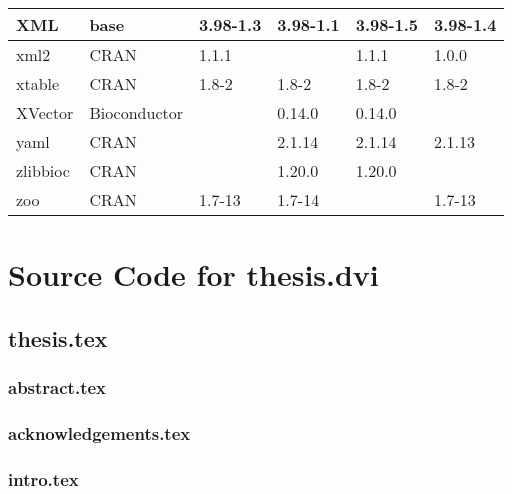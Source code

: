\begin{longtable}{|llllll|}
XML                           & base                      & 3.98-1.3    & 3.98-1.1    & 3.98-1.5       & 3.98-1.4         \\ \hline
xml2                          & CRAN                      & 1.1.1       &             & 1.1.1          & 1.0.0             \\ \hline \rowcolor{gray!25}
xtable                        & CRAN                      & 1.8-2       & 1.8-2       & 1.8-2          & 1.8-2            \\ \hline
XVector                       & Bioconductor              &             & 0.14.0      & 0.14.0         &                   \\ \hline \rowcolor{gray!25}
yaml                          & CRAN                      &             & 2.1.14      & 2.1.14         & 2.1.13           \\ \hline
zlibbioc                      & CRAN                      &             & 1.20.0      & 1.20.0         &                   \\ \hline \rowcolor{gray!25}
zoo                           & CRAN                      & 1.7-13      & 1.7-14      &                & 1.7-13           \\ \hline
\end{longtable}

\iffalse

\chapter{Source Code for thesis.dvi}

\linespread{1}
\footnotesize

\section{thesis.tex}

\subsection{abstract.tex}

\subsection{acknowledgements.tex}

\subsection{intro.tex}

